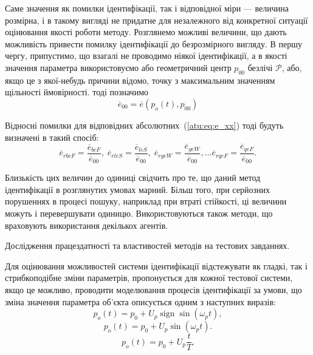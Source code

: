 \documentclass[a4paper,13pt]{atuaref}
\DeclareMathOperator*{\sign}{sign}
\begin{document}
Саме значення як помилки ідентифікації, так і відповідної міри ---
величина розмірна, і в такому вигляді не придатне для незалежного від
конкретної ситуації оцінювання якості роботи методу. Розглянемо можливі
величини, що дають можливість привести помилку ідентифікації до безрозмірного
вигляду. В першу чергу, припустимо, що взагалі не проводимо ніякої
ідентифікації, а в якості значення параметра використовуємо або геометричний
центр $ p_{00} $ безлічі $ \mathcal{P} $, або, якщо це з якої-небудь причини
відомо, точку з максимальним значенням щільності ймовірності. тоді позначимо
%
\begin{equation}
  \overline{e}_{00}
  =
  \overline{e}(p_o(t),p_{00})
  \label{atu:eq:e_00}
\end{equation}

Відносні помилки для відповідних абсолютних~(\ref{atu:eq:e_xx})
тоді будуть визначені в такий спосіб:
%
\begin{equation}
  \overline{e}_{rbcF} = \frac{\overline{e}_{bcF}}{\overline{e}_{00}}, \;
  \overline{e}_{rleS} = \frac{\overline{e}_{leS}}{\overline{e}_{00}}, \;
  \overline{e}_{rgeW} = \frac{\overline{e}_{geW}}{\overline{e}_{00}},
  \ldots
  \overline{e}_{rqeF} = \frac{\overline{e}_{qeF}}{\overline{e}_{00}}.
  \label{atu:eq:e_rxx}
\end{equation}

Близькість цих величин до одиниці свідчить про те, що даний метод ідентифікації
в розглянутих умовах марний. Більш того, при серйозних порушеннях в процесі
пошуку, наприклад при втраті стійкості, ці величини можуть і перевершувати
одиницю. Використовуються також методи, що враховують
використання декількох агентів.

Дослідження працездатності та властивостей методів на тестових завданнях.

Для оцінювання можливостей системи ідентифікації відстежувати як гладкі, так і
стрибкоподібне зміни параметрів, пропонується для кожної тестової системи, якщо
це можливо, проводити моделювання процесів ідентифікації за умови, що зміна
значення параметра об'єкта описується одним з наступних виразів:
%
\begin{equation}
  p_o(t) = p_0 +  U_{p} \sign \sin( \omega_{p} t ),
  \label{atu:eq:po_t_sign}
\end{equation}
%
%
\begin{equation}
  p_o(t) = p_0 +  U_{p} \sin( \omega_{p} t ).
  \label{atu:eq:po_t_sin}
\end{equation}
%
\begin{equation}
  p_o(t) = p_0 +  U_{p} \frac{t}{T}.
  \label{atu:eq:po_t_ramp}
\end{equation}
\end{document}
